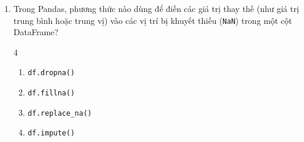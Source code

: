 \documentclass[11pt,a4paper]{article}
\begin{document}
\begin{enumerate}[leftmargin=*,itemsep=2.5pt,resume]
\item Trong Pandas, phương thức nào dùng để điền các giá trị thay thế (như giá trị trung bình hoặc trung vị) vào các vị trí bị khuyết thiếu (\texttt{NaN}) trong một cột DataFrame?
\begin{multicols}{4}
\begin{enumerate}[label=\Alph*.]
  \item \texttt{df.dropna()}
  \item \texttt{df.fillna()}
  \item \texttt{df.replace\_na()}
  \item \texttt{df.impute()}
\end{enumerate}
\end{multicols}

\end{enumerate}
\end{document}
